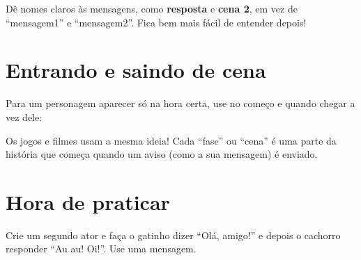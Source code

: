 \begin{dica}
Dê nomes claros às mensagens, como \textbf{resposta} e \textbf{cena 2}, em vez de ``mensagem1'' e ``mensagem2''. Fica bem mais fácil de entender depois!
\end{dica}

\section{Entrando e saindo de cena}

Para um personagem aparecer só na hora certa, use  no começo e  quando chegar a vez dele:

\begin{codigo}
\begin{pilha}
\end{pilha}
\begin{pilha}
\end{pilha}
\end{codigo}

\begin{curiosidade}
Os jogos e filmes usam a mesma ideia! Cada ``fase'' ou ``cena'' é uma parte da história que começa quando um aviso (como a sua mensagem) é enviado.
\end{curiosidade}

\section{Hora de praticar}

\begin{exercicio}
Crie um segundo ator e faça o gatinho dizer ``Olá, amigo!'' e depois o cachorro responder ``Au au! Oi!''. Use uma mensagem.
\end{exercicio}

\begin{solucao}
\begin{pilha}
\end{pilha}
\begin{pilha}
\end{pilha}
\end{solucao}

